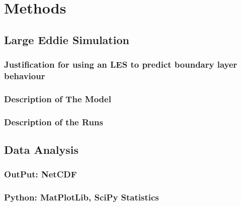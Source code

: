 
\chapter{Methods}
\label{ch:methods}

\section{Large Eddie Simulation}
\label{sec:LargeEddieSimulation}

\subsection{Justification for using an LES to predict boundary layer behaviour}

\subsection{Description of The Model}

\subsection{Description of the Runs}

\section{Data Analysis}
\label{sec:DataAnalysis}

\subsection{OutPut: NetCDF}

\subsection{Python: MatPlotLib, SciPy Statistics}

\endinput

Any text after an \endinput is ignored.
You could put scraps here or things in progress.
